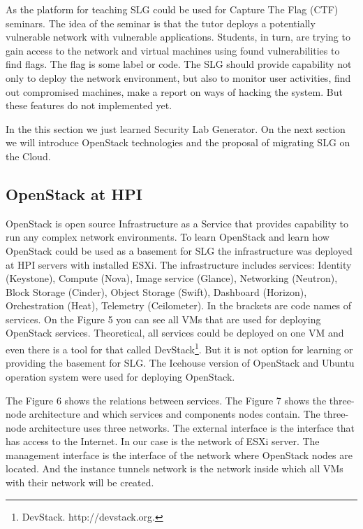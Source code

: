 As the platform for teaching SLG could be used for Capture The Flag (CTF) seminars. The idea of the seminar is that the tutor deploys a potentially vulnerable network with vulnerable applications. Students, in turn, are trying to gain access to the network and virtual machines using found vulnerabilities to find flags. The flag is some label or code. The SLG should provide capability not only to deploy the network environment, but also to monitor user activities, find out compromised machines, make a report on ways of hacking the system. But these features do not implemented yet. 
  
  
In the this section we just learned Security Lab Generator. On the next section we will introduce OpenStack technologies and the proposal of migrating SLG on the Cloud.


 




\subsection{OpenStack at HPI}
OpenStack is open source Infrastructure as a Service that provides capability to run any complex network environments. To learn OpenStack and learn how OpenStack could be used as a basement for SLG the infrastructure was deployed at HPI servers with installed ESXi. The infrastructure includes services: Identity (Keystone), Compute (Nova), Image service (Glance), Networking (Neutron), Block Storage (Cinder), Object Storage (Swift), Dashboard (Horizon), Orchestration (Heat), Telemetry (Ceilometer). In the brackets are code names of services. On the Figure 5 you can see all VMs that are used for deploying OpenStack services. Theoretical, all services could be deployed on one VM and even there is a tool for that called DevStack\footnote{DevStack. http://devstack.org.}. But it is not option for learning or providing the basement for SLG. The Icehouse version of OpenStack and Ubuntu operation system were used for deploying OpenStack.  

The Figure 6 shows the relations between services. The Figure 7 shows the three-node architecture and which services and components nodes contain. The three-node  architecture uses three networks. The external interface is the interface that has access to the Internet. In our case is the network of ESXi server. The management interface is the interface of the network where OpenStack nodes are located. And the instance tunnels network is the network inside which all VMs with their network will be created. 

